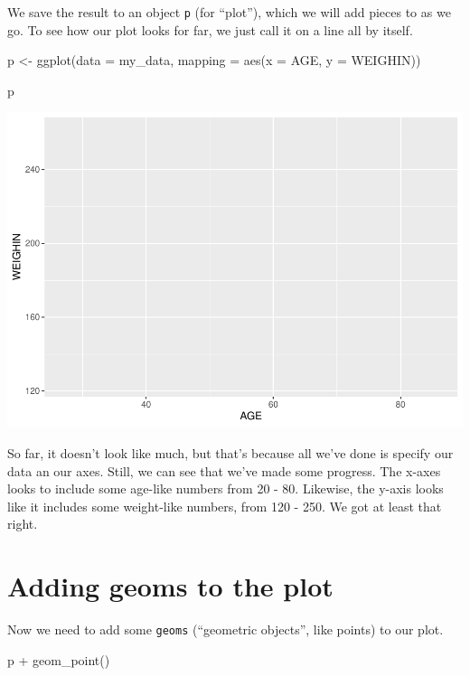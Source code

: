 \documentclass[
]{book}
\newenvironment{Shaded}{\begin{snugshade}}{\end{snugshade}}
\newcommand{\AttributeTok}[1]{\textcolor[rgb]{0.77,0.63,0.00}{#1}}
\newcommand{\FunctionTok}[1]{\textcolor[rgb]{0.00,0.00,0.00}{#1}}
\newcommand{\NormalTok}[1]{#1}
\newcommand{\OtherTok}[1]{\textcolor[rgb]{0.56,0.35,0.01}{#1}}
\newcommand{\SpecialCharTok}[1]{\textcolor[rgb]{0.00,0.00,0.00}{#1}}
\begin{document}
We save the result to an object \texttt{p} (for ``plot''), which we will add pieces to as we go. To see how our plot looks for far, we just call it on a line all by itself.

\begin{Shaded}
\begin{Highlighting}[]
\NormalTok{p }\OtherTok{\textless{}{-}} \FunctionTok{ggplot}\NormalTok{(}\AttributeTok{data =}\NormalTok{ my\_data, }\AttributeTok{mapping =} \FunctionTok{aes}\NormalTok{(}\AttributeTok{x =}\NormalTok{ AGE, }\AttributeTok{y =}\NormalTok{ WEIGHIN))}

\NormalTok{p}
\end{Highlighting}
\end{Shaded}

\includegraphics{_main_files/figure-latex/unnamed-chunk-88-1.pdf}

So far, it doesn't look like much, but that's because all we've done is specify our data an our axes. Still, we can see that we've made some progress. The x-axes looks to include some age-like numbers from 20 - 80. Likewise, the y-axis looks like it includes some weight-like numbers, from 120 - 250. We got at least that right.

\hypertarget{adding-geoms-to-the-plot}{%
\section{Adding geoms to the plot}\label{adding-geoms-to-the-plot}}

Now we need to add some \texttt{geoms} (``geometric objects'', like points) to our plot.

\begin{Shaded}
\begin{Highlighting}[]
\NormalTok{p }\SpecialCharTok{+} \FunctionTok{geom\_point}\NormalTok{()}
\end{Highlighting}
\end{Shaded}
\end{document}
